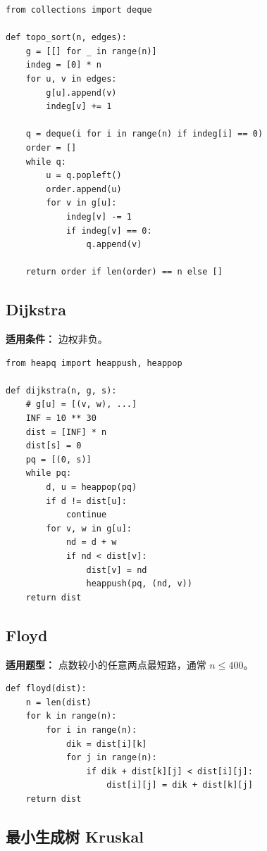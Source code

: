 \documentclass[UTF8,a4paper,14pt]{ctexart}
\begin{document}
\begin{lstlisting}
from collections import deque

def topo_sort(n, edges):
    g = [[] for _ in range(n)]
    indeg = [0] * n
    for u, v in edges:
        g[u].append(v)
        indeg[v] += 1

    q = deque(i for i in range(n) if indeg[i] == 0)
    order = []
    while q:
        u = q.popleft()
        order.append(u)
        for v in g[u]:
            indeg[v] -= 1
            if indeg[v] == 0:
                q.append(v)

    return order if len(order) == n else []
\end{lstlisting}

\subsection{Dijkstra}

\textbf{适用条件：}
边权非负。

\begin{lstlisting}
from heapq import heappush, heappop

def dijkstra(n, g, s):
    # g[u] = [(v, w), ...]
    INF = 10 ** 30
    dist = [INF] * n
    dist[s] = 0
    pq = [(0, s)]
    while pq:
        d, u = heappop(pq)
        if d != dist[u]:
            continue
        for v, w in g[u]:
            nd = d + w
            if nd < dist[v]:
                dist[v] = nd
                heappush(pq, (nd, v))
    return dist
\end{lstlisting}

\subsection{Floyd}

\textbf{适用题型：}
点数较小的任意两点最短路，通常 $n \le 400$。

\begin{lstlisting}
def floyd(dist):
    n = len(dist)
    for k in range(n):
        for i in range(n):
            dik = dist[i][k]
            for j in range(n):
                if dik + dist[k][j] < dist[i][j]:
                    dist[i][j] = dik + dist[k][j]
    return dist
\end{lstlisting}

\subsection{最小生成树 Kruskal}
\end{document}
